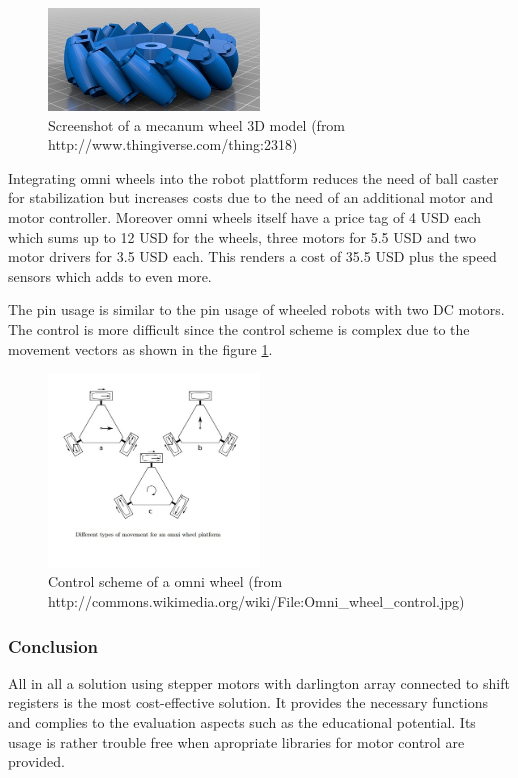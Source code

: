 \documentclass[11pt,a4paper]{article}
\begin{document}
\begin{figure}[h!]
  \centering
  \includegraphics[width=0.5\textwidth]{images/mecanum.png}
  \caption{Screenshot of a mecanum wheel 3D model (from http://www.thingiverse.com/thing:2318)}
\end{figure}

Integrating omni wheels into the robot plattform reduces the need of ball caster for stabilization but increases costs due to the need of an additional motor and motor controller. Moreover omni wheels itself have a price tag of 4 USD each which sums up to 12 USD for the wheels, three motors for 5.5 USD and two motor drivers for 3.5 USD each. This renders a cost of 35.5 USD plus the speed sensors which adds to even more. 

The pin usage is similar to the pin usage of wheeled robots with two DC motors. The control is more difficult since the control scheme is complex due to the movement vectors as shown in the figure \ref{fig:omnicontrol}.

\begin{figure}[h!]
  \centering
  \includegraphics[width=0.5\textwidth]{images/omniwheel.jpg}
  \caption{Control scheme of a omni wheel (from http://commons.wikimedia.org/wiki/File:Omni\_wheel\_control.jpg)}
  \label{fig:omnicontrol}
\end{figure}


\subsubsection{Conclusion}
All in all a solution using stepper motors with darlington array connected to shift registers is the most cost-effective solution. It provides the necessary functions and complies to the evaluation aspects such as the educational potential. Its usage is rather trouble free when apropriate libraries for motor control are provided.
\end{document}
